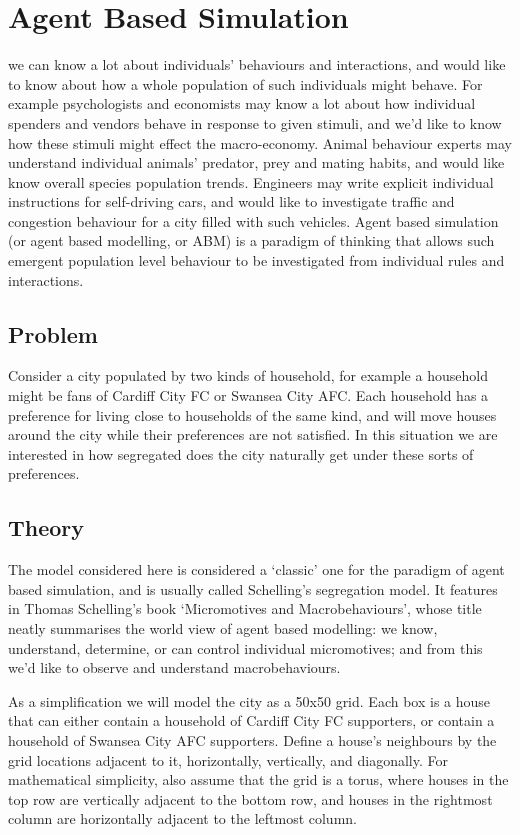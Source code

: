 \chapter[Agent Based Simulation]{Agent Based Simulation}

 we can know a lot about individuals' behaviours and
interactions, and would like to know about how a whole population of such
individuals might behave. For example psychologists and economists may know a
lot about how individual spenders and vendors behave in response to given
stimuli, and we'd like to know how these stimuli might effect the macro-economy.
Animal behaviour experts may understand individual animals' predator, prey and
mating habits, and would like know overall species population trends. Engineers
may write explicit individual instructions for self-driving cars, and would like
to investigate traffic and congestion behaviour for a city filled with such
vehicles. Agent based simulation (or agent based modelling, or ABM) is a
paradigm of thinking that allows such emergent population level behaviour to be
investigated from individual rules and interactions.

\section{Problem}\label{sec:problem}
Consider a city populated by two kinds of household, for example a household
might be fans of Cardiff City FC or Swansea City AFC. Each household has a
preference for living close to households of the same kind, and will move houses
around the city while their preferences are not satisfied.
In this situation we are interested in how segregated does the city naturally
get under these sorts of preferences.

\section{Theory}\label{sec:theory}
The model considered here is considered a `classic' one for the paradigm of
agent based simulation, and is usually called Schelling's segregation model.
It features in Thomas Schelling's book `Micromotives and Macrobehaviours', whose
title neatly summarises the world view of agent based modelling: we know,
understand, determine, or can control individual micromotives; and from this
we'd like to observe and understand macrobehaviours.

As a simplification we will model the city as a 50x50 grid.
Each box is a house that can either contain a household of Cardiff City FC
supporters, or contain a household of Swansea City AFC supporters.
Define a house's neighbours by the grid locations adjacent to it, horizontally,
vertically, and diagonally.
For mathematical simplicity, also assume that the grid is a torus, where houses
in the top row are vertically adjacent to the bottom row, and houses in the
rightmost column are horizontally adjacent to the leftmost column.

